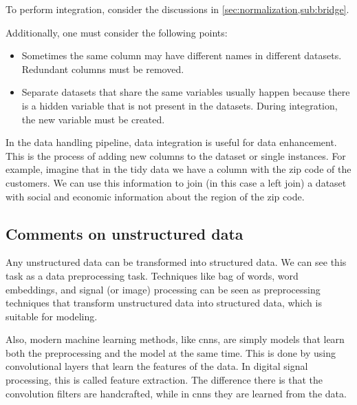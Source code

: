 To perform integration, consider the discussions in \cref{sec:normalization,sub:bridge}.

Additionally, one must consider the following points:
\begin{itemize}
  \item Sometimes the same column may have different names in different datasets.  Redundant
    columns must be removed.
  \item Separate datasets that share the same variables usually happen because there is a
    hidden variable that is not present in the datasets.  During integration, the new
    variable must be created.
\end{itemize}


In the data handling pipeline, data integration is useful for data enhancement.  This is
the process of adding new columns to the dataset or single instances.  For example,
imagine that in the tidy data we have a column with the zip code of the customers.  We can
use this information to join (in this case a left join) a dataset with social and economic
information about the region of the zip code.

\subsection{Comments on unstructured data}

Any unstructured data can be transformed into structured data.  We can see this task as a
data preprocessing task.  Techniques like bag of words, word embeddings, and signal (or
image) processing can be seen as preprocessing techniques that transform unstructured data
into structured data, which is suitable for modeling.

Also, modern machine learning methods, like \glspl{cnn}, are simply models that learn both
the preprocessing and the model at the same time.  This is done by using convolutional
layers that learn the features of the data.  In digital signal processing, this is called
feature extraction.  The difference there is that the convolution filters are handcrafted,
while in \glspl{cnn} they are learned from the data.

